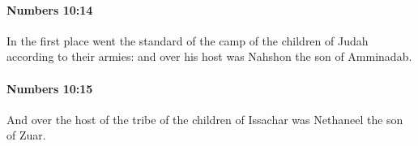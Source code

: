 		\paragraph{Numbers 10:14} %
			\label{NUMBERS-10-14}

			In the first place went the standard of the camp of the children of Judah according to their armies: and over his host was Nahshon the son of Amminadab.


		\paragraph{Numbers 10:15} %
			\label{NUMBERS-10-15}

			And over the host of the tribe of the children of Issachar was Nethaneel the son of Zuar.



